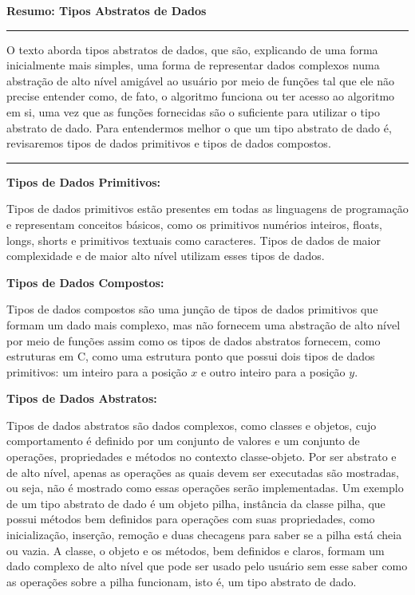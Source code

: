 \documentclass{article}
\begin{document}
\begin{center}

    \vspace*{-7mm}
    \textbf{\large{Resumo: Tipos Abstratos de Dados}}
    \vspace*{-4mm}

\end{center}

\noindent\rule{\textwidth}{0.5pt}

\bigskip

O texto aborda tipos abstratos de dados, que são, explicando de uma forma inicialmente mais simples, uma forma de representar dados complexos numa abstração de alto nível amigável ao usuário por meio de funções tal que ele não precise entender como, de fato, o algoritmo funciona ou ter acesso ao algoritmo em si, uma vez que as funções fornecidas são o suficiente para utilizar o tipo abstrato de dado. Para entendermos melhor o que um tipo abstrato de dado é, revisaremos tipos de dados primitivos e tipos de dados compostos.

\bigskip

\noindent\rule{\textwidth}{0.5pt}

\bigskip

\textbf{Tipos de Dados Primitivos:}

\medskip

Tipos de dados primitivos estão presentes em todas as linguagens de programação e representam conceitos básicos, como os primitivos numérios inteiros, floats, longs, shorts e primitivos textuais como caracteres. Tipos de dados de maior complexidade e de maior alto nível utilizam esses tipos de dados.

\medskip

\textbf{Tipos de Dados Compostos:}

\medskip

Tipos de dados compostos são uma junção de tipos de dados primitivos que formam um dado mais complexo, mas não fornecem uma abstração de alto nível por meio de funções assim como os tipos de dados abstratos fornecem, como estruturas em C, como uma estrutura ponto que possui dois tipos de dados primitivos: um inteiro para a posição $x$ e outro inteiro para a posição $y$.

\medskip

\textbf{Tipos de Dados Abstratos:}

\medskip

Tipos de dados abstratos são dados complexos, como classes e objetos, cujo comportamento é definido por um conjunto de valores e um conjunto de operações, propriedades e métodos no contexto classe-objeto. Por ser abstrato e de alto nível, apenas as operações as quais devem ser executadas são mostradas, ou seja, não é mostrado como essas operações serão implementadas. Um exemplo de um tipo abstrato de dado é um objeto pilha, instância da classe pilha, que possui métodos bem definidos para operações com suas propriedades, como inicialização, inserção, remoção e duas checagens para saber se a pilha está cheia ou vazia. A classe, o objeto e os métodos, bem definidos e claros, formam um dado complexo de alto nível que pode ser usado pelo usuário sem esse saber como as operações sobre a pilha funcionam, isto é, um tipo abstrato de dado.
\end{document}
